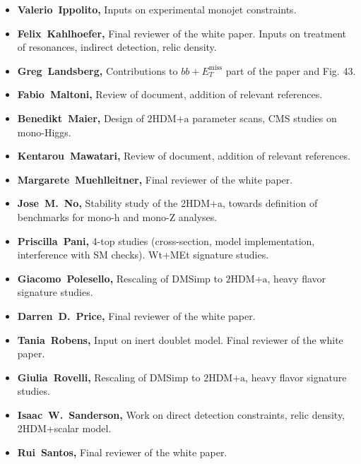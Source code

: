 \documentclass[a4paper, 11pt,notoc]{article}
\newcommand{\MET}{\ensuremath{E_T^\mathrm{miss}}\xspace}
\newcommand{\hdma}{\ensuremath{\textrm{2HDM+a}}\xspace}
\begin{document}
\begin{itemize}
\item \textbf{Valerio~Ippolito,} Inputs on experimental monojet constraints. 

\item \textbf{Felix~Kahlhoefer,} Final reviewer of the white paper. Inputs on treatment of resonances, indirect detection, relic density. 

\item \textbf{Greg~Landsberg,} Contributions to $bb+\MET$ part of the paper and Fig. 43.

\item \textbf{Fabio~Maltoni,} Review of document, addition of relevant references.

\item \textbf{Benedikt~Maier,} Design of \hdma parameter scans, CMS studies on mono-Higgs.

\item \textbf{Kentarou~Mawatari,} Review of document, addition of relevant references.

\item \textbf{Margarete~Muehlleitner,} Final reviewer of the white paper. 

\item \textbf{Jose~M.~No,} Stability study of the 2HDM+a, towards definition of benchmarks for mono-h and mono-Z analyses.

\item \textbf{Priscilla~Pani,} 4-top studies (cross-section, model implementation, interference with SM checks). Wt+MEt signature studies. 

\item \textbf{Giacomo~Polesello,} Rescaling of DMSimp to \hdma, heavy flavor signature studies. 

\item \textbf{Darren~D.~Price,}  Final reviewer of the white paper. 

\item \textbf{Tania~Robens,} Input on inert doublet model. Final reviewer of the white paper. 

\item \textbf{Giulia~Rovelli,} Rescaling of DMSimp to \hdma, heavy flavor signature studies. 

\item \textbf{Isaac~W.~Sanderson,}  Work on direct detection constraints, relic density, 2HDM+scalar model.

\item \textbf{Rui~Santos,}  Final reviewer of the white paper. 


\end{itemize}
\end{document}
